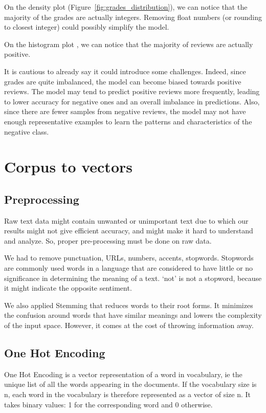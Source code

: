 \documentclass{article}
\begin{document}
On the density plot (Figure~\ref{fig:grades_distribution}), 
we can notice that the majority of the grades are actually integers. Removing float numbers (or rounding to closest integer) could possibly simplify the model.

On the histogram plot , we can notice that the majority of reviews are actually positive.

It is cautious to already say it could introduce some challenges. Indeed, since grades are quite imbalanced, the model can become biased towards positive reviews. The model may tend to predict positive reviews more frequently, leading to lower accuracy for negative ones and an overall imbalance in predictions. Also, since there are fewer samples from negative reviews, the model may not have enough representative examples to learn the patterns and characteristics of the negative class.

\section{Corpus to vectors}

\subsection{Preprocessing}

Raw text data might contain unwanted or unimportant text due to which our results might not give efficient accuracy, and might make it hard to understand and analyze. So, proper pre-processing must be done on raw data.

We had to remove punctuation, URLs, numbers, accents, stopwords.
Stopwords are commonly used words in a language that are considered to have little or no significance in determining the meaning of a text.
`not' is not a stopword, because it might indicate the opposite sentiment.

We also applied Stemming that reduces words to their root forms. It minimizes the confusion around words that have similar meanings and lowers the complexity of the input space. However, it comes at the cost of throwing information away.

\subsection{One Hot Encoding}

One Hot Encoding is a vector representation of a word in vocabulary, ie the unique list of all the words appearing in the documents.
If the vocabulary size is n, each word in the vocabulary is therefore represented as a vector of size n. It takes binary values: 1 for the corresponding word and 0 otherwise.
\end{document}
